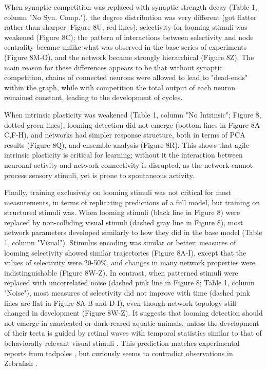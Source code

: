 \documentclass{article}
\begin{document}
When synaptic competition was replaced with synaptic strength decay (Table 1, column "No Syn. Comp."), the degree distribution was very different (got flatter rather than sharper; Figure 8U, red lines); selectivity for looming stimuli was weakened (Figure 8C); the pattern of interactions between selectivity and node centrality became unlike what was observed in the base series of experiments (Figure 8M-O), and the network became strongly hierarchical (Figure 8Z). The main reason for these differences appears to be that without synaptic competition, chains of connected neurons were allowed to lead to "dead-ends" within the graph, while with competition the total output of each neuron remained constant, leading to the development of cycles. 

When intrinsic plasticity was weakened (Table 1, column "No Intrinsic"; Figure 8, dotted green lines), looming detection did not emerge (bottom lines in Figure 8A-C,F-H), and networks had simpler response structure, both in terms of PCA results (Figure 8Q), and ensemble analysis (Figure 8R). This shows that agile intrinsic plasticity is critical for learning; without it the interaction between neuronal activity and network connectivity is disrupted, as the network cannot process sensory stimuli, yet is prone to spontaneous activity.

Finally, training exclusively on looming stimuli was not critical for most measurements, in terms of replicating predictions of a full model, but training on structured stimuli was. When looming stimuli (black line in Figure 8) were replaced by non-colliding visual stimuli (dashed gray line in Figure 8), most network parameters developed similarly to how they did in the base model (Table 1, column "Visual"). Stimulus encoding was similar or better; measures of looming selectivity showed similar trajectories (Figure 8A-I), except that the values of selectivity were 20-50\%, and changes in many network properties were indistinguishable (Figure 8W-Z). In contrast, when patterned stimuli were replaced with uncorrelated noise (dashed pink line in Figure 8; Table 1, column "Noise"), most measures of selectivity did not improve with time (dashed pink lines are flat in Figure 8A-B and D-I), even though network topology still changed in development (Figure 8W-Z). It suggests that looming detection should not emerge in enucleated or dark-reared aquatic animals, unless the development of their tecta is guided by retinal waves with temporal statistics similar to that of behaviorally relevant visual stimuli \citep{huberman2008waves}. This prediction matches experimental reports from tadpoles \citep{xu2011}, but curiously seems to contradict observations in Zebrafish \citep{pietri2017emergence}.
\end{document}
